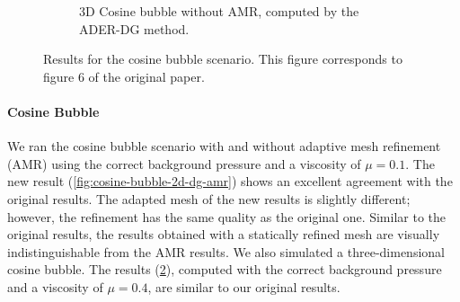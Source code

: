 \documentclass[runningheads]{llncs}
\begin{document}
\begin{figure}[tb]
\begin{subfigure}[t]{0.45\columnwidth}
  \caption{\label{fig:cosine-bubble-3d-dg-noamr}%
  3D Cosine bubble without AMR, computed by the ADER-DG method.}
  \end{subfigure}
\caption{
  Results for the cosine bubble scenario.
  This figure corresponds to figure 6 of the original paper.
}
\end{figure}
\paragraph{Cosine Bubble}
We ran the cosine bubble scenario with and without adaptive mesh refinement (AMR) using the correct background pressure and a viscosity of $\mu=0.1$. 
The new result (\cref{fig:cosine-bubble-2d-dg-amr}) shows an excellent agreement with the original results.
The adapted mesh of the new results is slightly different; however, the refinement has the same quality as the original one.
Similar to the original results, the results obtained with a statically refined mesh are visually indistinguishable from the AMR results.
We also simulated a three-dimensional cosine bubble.
The results (\cref{fig:cosine-bubble-3d-dg-noamr}), computed with the correct background pressure and a viscosity of $\mu=0.4$, are similar to our original results.
\end{document}
